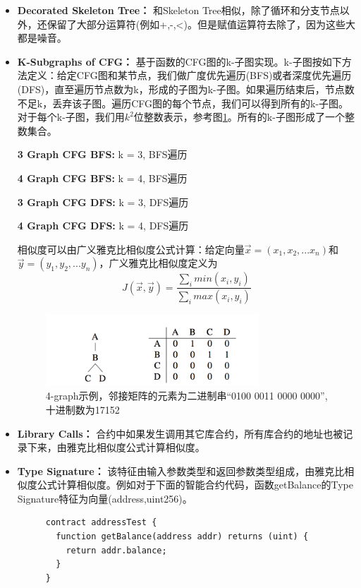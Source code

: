 \begin{itemize}
	\item \textbf{Decorated Skeleton Tree：} 和Skeleton Tree相似，除了循环和分支节点以外，还保留了大部分运算符(例如+,-,<)。但是赋值运算符去除了，因为这些大都是噪音。
	\item \textbf{K-Subgraphs of CFG：} 基于函数的CFG图的k-子图实现。k-子图按如下方法定义：给定CFG图和某节点，我们做广度优先遍历(BFS)或者深度优先遍历(DFS)，直至遍历节点数为k，形成的子图为k-子图。如果遍历结束后，节点数不足k，丢弃该子图。遍历CFG图的每个节点，我们可以得到所有的k-子图。对于每个k-子图，我们用$k^{2}$位整数表示，参考图\ref{fig:graph-ex}。所有的k-子图形成了一个整数集合。
	
	\textbf{3 Graph CFG BFS:} k = 3, BFS遍历
	
	\textbf{4 Graph CFG BFS:} k = 4, BFS遍历
	
	\textbf{3 Graph CFG DFS:} k = 3, DFS遍历
	
	\textbf{4 Graph CFG DFS:} k = 4, DFS遍历
	
	相似度可以由广义雅克比相似度公式计算：给定向量$\vec{x}=(x_{1},x_{2},...x_{n})$和$\vec{y}=(y_{1},y_{2},...y_{n})$，广义雅克比相似度定义为
	\begin{equation}
	J(\vec{x},\vec{y})=\frac{\sum_imin(x_{i},y_{i})}{\sum_imax(x_{i},y_{i})}
	\end{equation}
	
	
	\begin{figure}[h]
	\centering
	\includegraphics[width=8cm]{./figs/graph-matrix.png}
	\caption{4-graph示例，邻接矩阵的元素为二进制串“0100 0011 0000 0000”, 十进制数为17152}
	\label{fig:graph-ex}
	\end{figure}


	\item \textbf{Library Calls：} 合约中如果发生调用其它库合约，所有库合约的地址也被记录下来，由雅克比相似度公式计算相似度。
	\item \textbf{Type Signature：} 该特征由输入参数类型和返回参数类型组成，由雅克比相似度公式计算相似度。例如对于下面的智能合约代码，函数getBalance的Type Signature特征为向量(address,uint256)。 \\
	
	\begin{figure}[h]
  	\centering
  	\begin{minipage}{.7\linewidth}
	\begin{lstlisting}[frame=single]
contract addressTest {
  function getBalance(address addr) returns (uint) {
  	return addr.balance;
  }
}
	\end{lstlisting}
  	\end{minipage}
	\end{figure}


\end{itemize}
